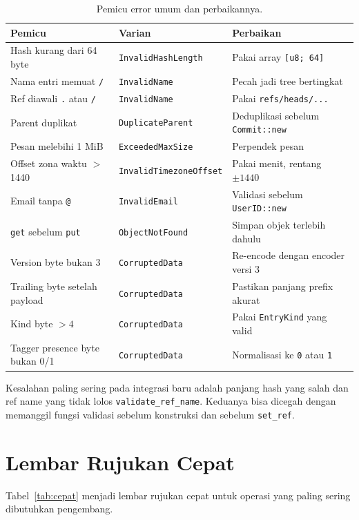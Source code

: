 \documentclass[11pt,a4paper]{article}
\begin{document}
\begin{table}[H]
	\centering
	\caption{Pemicu error umum dan perbaikannya.}
	\label{tab:kesalahan}
	\footnotesize
	\begin{tabularx}{\textwidth}{X l X}
		\toprule
		Pemicu & Varian & Perbaikan \\
		\midrule
		Hash kurang dari 64 byte & \texttt{InvalidHashLength} & Pakai array \texttt{[u8; 64]} \\
		Nama entri memuat \texttt{/} & \texttt{InvalidName} & Pecah jadi tree bertingkat \\
		Ref diawali \texttt{.} atau \texttt{/} & \texttt{InvalidName} & Pakai \texttt{refs/heads/...} \\
		Parent duplikat & \texttt{DuplicateParent} & Deduplikasi sebelum \texttt{Commit::new} \\
		Pesan melebihi 1 MiB & \texttt{ExceededMaxSize} & Perpendek pesan \\
		Offset zona waktu $>$ 1440 & \texttt{InvalidTimezoneOffset} & Pakai menit, rentang $\pm 1440$ \\
		Email tanpa \texttt{@} & \texttt{InvalidEmail} & Validasi sebelum \texttt{UserID::new} \\
		\texttt{get} sebelum \texttt{put} & \texttt{ObjectNotFound} & Simpan objek terlebih dahulu \\
		Version byte bukan 3 & \texttt{CorruptedData} & Re-encode dengan encoder versi 3 \\
		Trailing byte setelah payload & \texttt{CorruptedData} & Pastikan panjang prefix akurat \\
		Kind byte $> 4$ & \texttt{CorruptedData} & Pakai \texttt{EntryKind} yang valid \\
		Tagger presence byte bukan 0/1 & \texttt{CorruptedData} & Normalisasi ke \texttt{0} atau \texttt{1} \\
		\bottomrule
	\end{tabularx}
\end{table}

Kesalahan paling sering pada integrasi baru adalah panjang hash yang salah dan ref name yang tidak lolos \texttt{validate\_ref\_name}. Keduanya bisa dicegah dengan memanggil fungsi validasi sebelum konstruksi dan sebelum \texttt{set\_ref}.

\section{Lembar Rujukan Cepat}

Tabel~\ref{tab:cepat} menjadi lembar rujukan cepat untuk operasi yang paling sering dibutuhkan pengembang.
\end{document}
